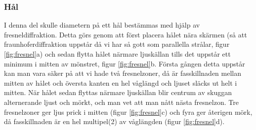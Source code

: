 \documentclass[a4paper]{article}
\begin{document}
\subsubsection{Hål}
I denna del skulle diametern på ett hål bestämmas med hjälp av fresneldiffraktion. Detta görs genom att först placera hålet
nära skärmen (så att fraunhoferdiffraktion uppstår då vi har så gott som parallella strålar, figur \ref{fig:fresnel}a) och sedan flytta hålet närmare ljuskällan
tills det uppstår ett minimum i mitten av mönstret, figur \ref{fig:fresnel}b. Första gången detta uppstår kan man vara säker på att vi hade två fresnelzoner, då
är fasskillnaden mellan mitten av hålet och översta kanten en hel våglängd och ljuset släcks ut helt i mitten. När hålet sedan flyttas närmare ljuskällan blir centrum
av skuggan alternerande ljust och mörkt, och man vet att man nått nästa fresnelzon. Tre fresnelzoner ger ljus prick i mitten (figur \ref{fig:fresnel}c) och fyra ger återigen
mörk, då fasskillnaden är en hel multipel(2) av våglängden (figur \ref{fig:fresnel}d).
\end{document}
